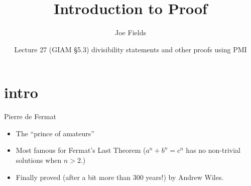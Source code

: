 \documentclass[handout,landscape]{beamer}
\author{Joe Fields}
\title{Introduction to Proof}
\date{Lecture 27 (GIAM \S 5.3) \newline divisibility statements and other proofs using PMI}
\institute[SCSU]{ {\tt fieldsj1@southernct.edu} }
\begin{document}
\begin{frame}[plain]
  \titlepage
\end{frame}

\section{intro}

\begin{frame}{Pierre de Fermat}
\begin{itemize}
\item The ``prince of amateurs'' \pause
\item Most famous for Fermat's Last Theorem ($a^n + b^n = c^n$ has no non-trivial solutions when $n>2$.) \pause
\item Finally proved (after a bit more than 300 years!) by Andrew Wiles. \pause
\end{itemize}
\end{frame}


{ %
\begin{frame}[plain]
\rule{0pt}{0pt}
\end{frame} 
} %
\end{document}
